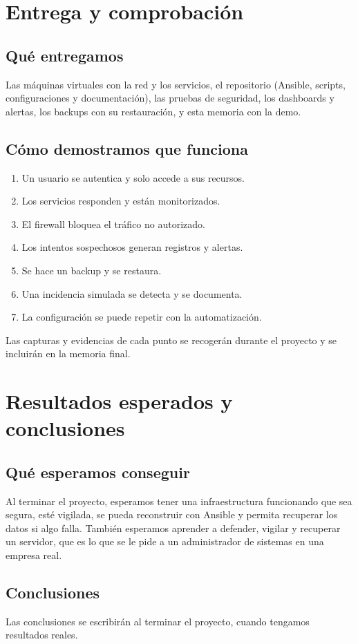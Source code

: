 \documentclass[12pt,a4paper]{article}
\begin{document}
\section{Entrega y comprobación}
\subsection{Qué entregamos}
Las máquinas virtuales con la red y los servicios, el repositorio (Ansible, scripts, configuraciones y documentación), las pruebas de seguridad, los dashboards y alertas, los backups con su restauración, y esta memoria con la demo.

\subsection{Cómo demostramos que funciona}
\begin{enumerate}
\item Un usuario se autentica y solo accede a sus recursos.
\item Los servicios responden y están monitorizados.
\item El firewall bloquea el tráfico no autorizado.
\item Los intentos sospechosos generan registros y alertas.
\item Se hace un backup y se restaura.
\item Una incidencia simulada se detecta y se documenta.
\item La configuración se puede repetir con la automatización.
\end{enumerate}
Las capturas y evidencias de cada punto se recogerán durante el proyecto y se incluirán en la memoria final.

\section{Resultados esperados y conclusiones}
\subsection{Qué esperamos conseguir}
Al terminar el proyecto, esperamos tener una infraestructura funcionando que sea segura, esté vigilada, se pueda reconstruir con Ansible y permita recuperar los datos si algo falla. También esperamos aprender a defender, vigilar y recuperar un servidor, que es lo que se le pide a un administrador de sistemas en una empresa real.

\subsection{Conclusiones}
Las conclusiones se escribirán al terminar el proyecto, cuando tengamos resultados reales.
\end{document}
